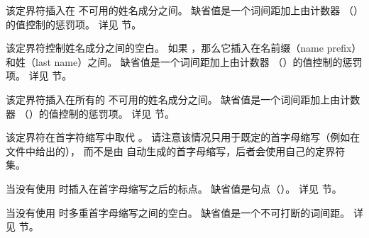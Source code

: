 \begin{ltxsyntax}
该定界符插入在  不可用的姓名成分之间。
缺省值是一个词间距加上由计数器 （）的值控制的惩罚项。
详见  节。

该定界符控制姓名成分之间的空白。
如果 ，那么它插入在名前缀（name prefix）和姓（last name）之间。
缺省值是一个词间距加上由计数器 （）的值控制的惩罚项。
详见  节。

该定界符插入在所有的  不可用的姓名成分之间。
缺省值是一个词间距加上由计数器 （）的值控制的惩罚项。
详见  节。

该定界符在首字符缩写中取代 。
请注意该情况只用于既定的首字母缩写（例如在  文件中给出的），
而不是由 \biblatex 自动生成的首字母缩写，后者会使用自己的定界符集。

当没有使用  时插入在首字母缩写之后的标点。
缺省值是句点（）。
详见  节。

当没有使用  时多重首字母缩写之间的空白。
缺省值是一个不可打断的词间距。
详见  节。


\end{ltxsyntax}
